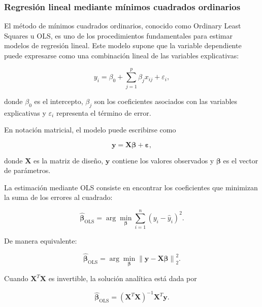 \subsubsection{Regresión lineal mediante mínimos cuadrados ordinarios}
\label{sec:ols}

El método de mínimos cuadrados ordinarios, conocido como Ordinary Least Squares u OLS, es uno de los procedimientos fundamentales para estimar modelos de regresión lineal. Este modelo supone que la variable dependiente puede expresarse como una combinación lineal de las variables explicativas:

\begin{equation}
    y_i
    =
    \beta_0
    +
    \sum_{j=1}^{p}\beta_j x_{ij}
    +
    \varepsilon_i,
\end{equation}

donde $\beta_0$ es el intercepto, $\beta_j$ son los coeficientes asociados con las variables explicativas y $\varepsilon_i$ representa el término de error.

En notación matricial, el modelo puede escribirse como

\begin{equation}
    \mathbf{y}
    =
    \mathbf{X}\boldsymbol{\beta}
    +
    \boldsymbol{\varepsilon},
\end{equation}

donde $\mathbf{X}$ es la matriz de diseño, $\mathbf{y}$ contiene los valores observados y $\boldsymbol{\beta}$ es el vector de parámetros.

La estimación mediante OLS consiste en encontrar los coeficientes que minimizan la suma de los errores al cuadrado:

\begin{equation}
    \hat{\boldsymbol{\beta}}_{\mathrm{OLS}}
    =
    \arg\min_{\boldsymbol{\beta}}
    \sum_{i=1}^{n}
    \left(
        y_i-\hat{y}_i
    \right)^2.
\end{equation}

De manera equivalente:

\begin{equation}
    \hat{\boldsymbol{\beta}}_{\mathrm{OLS}}
    =
    \arg\min_{\boldsymbol{\beta}}
    \left\|
        \mathbf{y}-\mathbf{X}\boldsymbol{\beta}
    \right\|_2^2.
\end{equation}

Cuando $\mathbf{X}^{T}\mathbf{X}$ es invertible, la solución analítica está dada por

\begin{equation}
    \hat{\boldsymbol{\beta}}_{\mathrm{OLS}}
    =
    \left(
        \mathbf{X}^{T}\mathbf{X}
    \right)^{-1}
    \mathbf{X}^{T}\mathbf{y}.
\end{equation}

